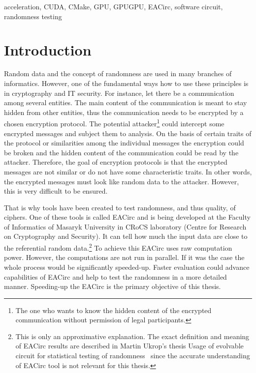 \documentclass[12pt,oneside]{fithesis2}
\begin{document}
\FrontMatter
	\ThesisTitlePage
	\begin{ThesisDeclaration}
		\DeclarationText
		\AdvisorName
	\end{ThesisDeclaration}
	\begin{ThesisKeyWords}
		acceleration, CUDA, CMake, GPU, GPUGPU, EACirc, software circuit, randomness testing
	\end{ThesisKeyWords}
	\tableofcontents

\MainMatter
\chapter{Introduction}
Random data and the concept of randomness are used in many branches of informatics. However, one of the fundamental ways how to use these principles is in cryptography and IT security. For instance, let there be a communication among several entities. The main content of the communication is meant to stay hidden from other entities, thus the communication needs to be encrypted by a chosen encryption protocol. The potential attacker\footnote{The one who wants to know the hidden content of the encrypted communication without permission of legal participants.} could intercept some encrypted messages and subject them to analysis. On the basis of certain traits of the protocol or similarities among the individual messages the encryption could be broken and the hidden content of the communication could be read by the attacker. Therefore, the goal of encryption protocols is that the encrypted messages are not similar or do not have some characteristic traits. In other words, the encrypted messages must look like random data to the attacker. However, this is very difficult to be ensured.

That is why tools have been created to test randomness, and thus quality, of ciphers. One of these tools is called EACirc and is being developed at the Faculty of Informatics of Masaryk University in CRoCS laboratory (Centre for Research on Cryptography and Security). It can tell how much the input data are close to the referential random data.\footnote{This is only an approximative explanation. The exact definition and meaning of EACirc results are described in Martin Ukrop's thesis Usage of evolvable circuit for statistical testing of randomness~\cite{ukrop_thesis} since the accurate understanding of EACirc tool is not relevant for this thesis.} To achieve this EACirc uses raw computation power. However, the computations are not run in parallel. If it was the case the whole process would be significantly speeded-up. Faster evaluation could advance capabilities of EACirc and help to test the randomness in a more detailed manner. Speeding-up the EACirc is the primary objective of this thesis.
\end{document}
